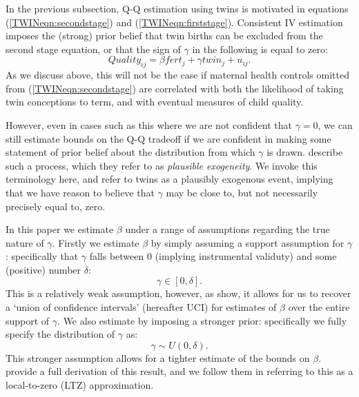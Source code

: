 
In the previous subsection, Q-Q estimation using twins is motivated in equations 
(\ref{TWINeqn:secondstage}) and (\ref{TWINeqn:firststage}).  Consistent IV
estimation imposes the (strong) prior belief that twin births can be excluded 
from the second stage equation, or that the sign of $\gamma$ in the following 
is equal to zero:
\begin{equation}
\label{TWINeqn:Conley}
Quality_{ij}=\beta fert_j + \gamma twin_j + u_{ij}.
\end{equation}
As we discuss above, this will not be the case if maternal health controls 
omitted from (\ref{TWINeqn:secondstage}) are correlated with both the 
likelihood of taking twin conceptions to term, and with eventual measures of 
child quality.

However, even in cases such as this where we are not confident that $\gamma=0$,
we can still estimate bounds on the Q-Q tradeoff if we are confident in making
some statement of prior belief about the distribution from which $\gamma$ is 
drawn.  \citet{Conleyetal2012} describe such a process, which they refer to as 
\emph{plausible exogeneity}.  We invoke this terminology here, and refer to 
twins as a plausibly exogenous event, implying that we have reason to believe 
that $\gamma$ may be close to, but not necessarily precisely equal to, zero.

In this paper we estimate $\beta$ under a range of assumptions regarding the
true nature of $\gamma$.  Firstly we estimate $\beta$ by simply assuming a
support assumption for $\gamma$: specifically that $\gamma$ falls between 0 
(implying instrumental validuty) and some (positive) number $\delta$:
\begin{equation}
\label{TWINeqn:uci}
\gamma \in [0,\delta ].
\end{equation}
This is a relatively weak assumption, however, as \citet{Conleyetal2012} show,
it allows for us to recover a `union of confidence intervals' (hereafter UCI) 
for estimates of $\beta$ over the entire support of $\gamma$.  We also estimate 
by imposing a stronger prior: specifically we fully specify the distribution of
$\gamma$ as:
\begin{equation}
\label{TWINeqn:ltz}
\gamma \sim U(0,\delta).
\end{equation}
This stronger assumption allows for a tighter estimate of the bounds on $\beta$.
\citet{Conleyetal2012} provide a full derivation of this result, and we follow
them in referring to this as a local-to-zero (LTZ) approximation.

